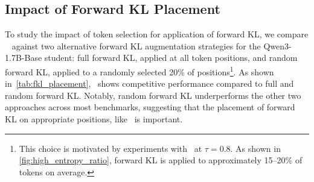 \subsection{Impact of Forward KL Placement}\label{sec:fkl_placement}
To study the impact of token selection for application of forward KL, we compare \method~ against two alternative forward KL augmentation strategies for the Qwen3-1.7B-Base student: full forward KL, applied at all token positions, and random forward KL, applied to a randomly selected 20\% of positions\footnote{This choice is motivated by experiments with \method~at $\tau = 0.8$. As shown in \autoref{fig:high_entropy_ratio}, forward KL is applied to approximately 15–20\% of tokens on average.}.
As shown in~\autoref{tab:fkl_placement}, \method~shows competitive performance compared to full and random forward KL. Notably, random forward KL underperforms the other two approaches across most benchmarks, suggesting that the placement of forward KL on appropriate positions, like \method~is important.

